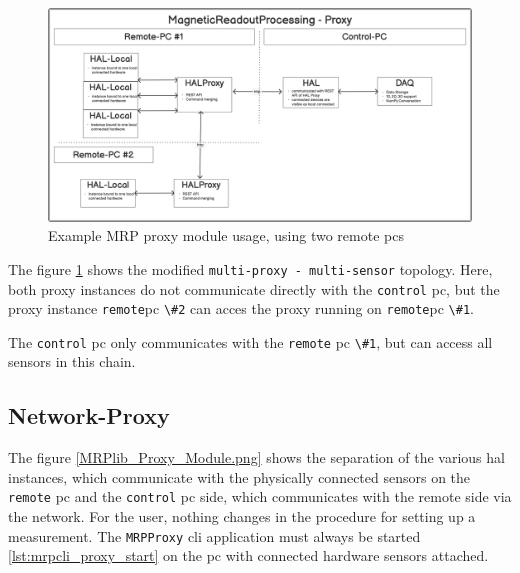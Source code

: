 \begin{figure}
\centering
\includegraphics{./generated_images/border_Example_MRP_proxy_module_usage,_using_two_remote_(+pc)s.png}
\caption{Example MRP proxy module usage, using two remote \gls{pc}s
\label{Example_MRP_proxy_module_usage,_using_two_remote_(+pc)s.png}}
\end{figure}

The figure
\ref{Example_MRP_proxy_module_usage,_using_two_remote_(+pc)s.png} shows
the modified \passthrough{\lstinline!multi-proxy - multi-sensor!}
topology. Here, both proxy instances do not communicate directly with
the \passthrough{\lstinline!control!} \gls{pc}, but the proxy instance
\passthrough{\lstinline!remote!}\gls{pc} \passthrough{\lstinline!\#2!}
can acces the proxy running on \passthrough{\lstinline!remote!}\gls{pc}
\passthrough{\lstinline!\#1!}.

The \passthrough{\lstinline!control!} \gls{pc} only communicates with
the \passthrough{\lstinline!remote!} \gls{pc}
\passthrough{\lstinline!\#1!}, but can access all sensors in this chain.

\hypertarget{network-proxy}{%
\subsection{Network-Proxy}\label{network-proxy}}

The figure \ref{MRPlib_Proxy_Module.png} shows the separation of the
various \gls{hal} instances, which communicate with the physically
connected sensors on the \passthrough{\lstinline!remote!} \gls{pc} and
the \passthrough{\lstinline!control!} \gls{pc} side, which communicates
with the remote side via the network. For the user, nothing changes in
the procedure for setting up a measurement. The
\passthrough{\lstinline!MRPProxy!} \gls{cli} application must always be
started \ref{lst:mrpcli_proxy_start} on the \gls{pc} with connected
hardware sensors attached.

